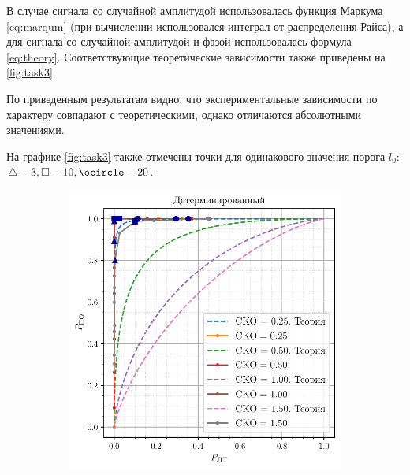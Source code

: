 В случае сигнала со случайной амплитудой использовалась функция Маркума \eqref{eq:marqum} 
(при вычислении использовался интеграл от распределения Райса), а для сигнала со случайной амплитудой и фазой
использовалась формула \eqref{eq:theory}. Соответствующие теоретические зависимости также приведены на \ref{fig:task3}.

По приведенным результатам видно, что экспериментальные зависимости по характеру совпадают с теоретическими,
однако отличаются абсолютными значениями.

На графике \ref{fig:task3} также отмечены точки для одинакового значения порога $l_0$: $\triangle - 3, \square - 10, \ocircle - 20$.

\begin{figure}[H]
    \centering
    \begin{subfigure}{0.49\linewidth}
        \includegraphics[width=\linewidth]{data/data_determ.pdf}
    \end{subfigure}
    \begin{subfigure}{0.49\linewidth}

\end{subfigure}
\end{figure}
